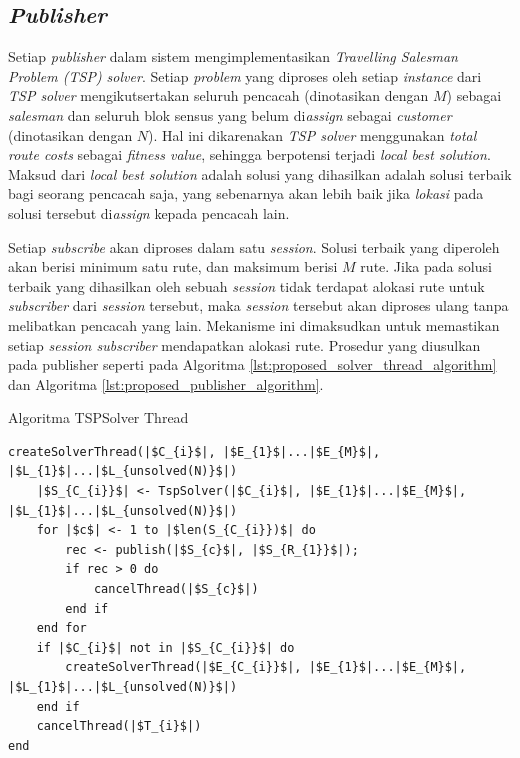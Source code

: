 \subsection{\textit{Publisher}}


Setiap \textit{publisher} dalam sistem mengimplementasikan \textit{Travelling Salesman Problem (TSP) solver}. Setiap \textit{problem} yang diproses oleh setiap \textit{instance} dari \textit{TSP solver} mengikutsertakan seluruh pencacah (dinotasikan dengan $M$) sebagai \textit{salesman} dan seluruh blok sensus yang belum di\textit{assign} sebagai \textit{customer} (dinotasikan dengan $N$). Hal ini dikarenakan \textit{TSP solver} menggunakan \textit{total route costs} sebagai \textit{fitness value}, sehingga berpotensi terjadi \textit{local best solution}. Maksud dari \textit{local best solution} adalah solusi yang dihasilkan adalah solusi terbaik bagi seorang pencacah saja, yang sebenarnya akan lebih baik jika \textit{lokasi} pada solusi tersebut di\textit{assign} kepada pencacah lain.


Setiap \textit{subscribe} akan diproses dalam satu \textit{session}. Solusi terbaik yang diperoleh akan berisi minimum satu rute, dan maksimum berisi $M$ rute. Jika pada solusi terbaik yang dihasilkan oleh sebuah \textit{session} tidak terdapat alokasi rute untuk \textit{subscriber} dari \textit{session} tersebut, maka \textit{session} tersebut akan diproses ulang tanpa melibatkan pencacah yang lain. Mekanisme ini dimaksudkan untuk memastikan setiap \textit{session subscriber} mendapatkan alokasi rute. Prosedur yang diusulkan pada publisher seperti pada Algoritma \ref{lst:proposed_solver_thread_algorithm} dan Algoritma \ref{lst:proposed_publisher_algorithm}.


\begin{listing}
	\caption{Algoritma TSPSolver Thread}
	\label{lst:proposed_solver_thread_algorithm}
	\begin{verbatim}
createSolverThread(|$C_{i}$|, |$E_{1}$|...|$E_{M}$|, |$L_{1}$|...|$L_{unsolved(N)}$|)
	|$S_{C_{i}}$| <- TspSolver(|$C_{i}$|, |$E_{1}$|...|$E_{M}$|, |$L_{1}$|...|$L_{unsolved(N)}$|)
	for |$c$| <- 1 to |$len(S_{C_{i}})$| do
		rec <- publish(|$S_{c}$|, |$S_{R_{1}}$|);
		if rec > 0 do
			cancelThread(|$S_{c}$|)
		end if
	end for
	if |$C_{i}$| not in |$S_{C_{i}}$| do
		createSolverThread(|$E_{C_{i}}$|, |$E_{1}$|...|$E_{M}$|, |$L_{1}$|...|$L_{unsolved(N)}$|)
	end if
	cancelThread(|$T_{i}$|)
end
	\end{verbatim}
\end{listing}


